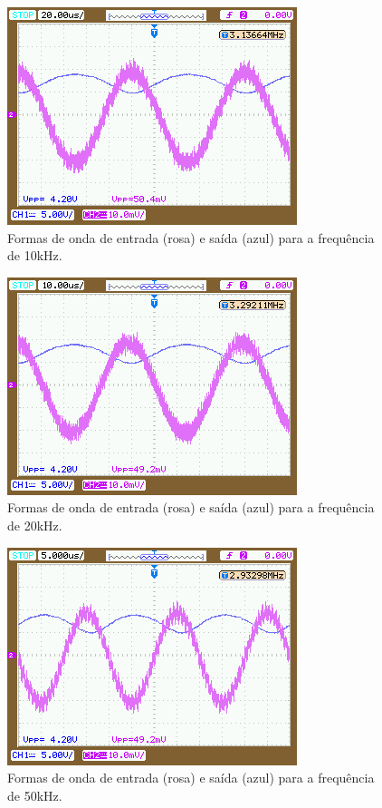 \documentclass{abntex2}
\begin{document}
  \begin{figure}[h]
    \centering
    \includegraphics[scale = 0.5]{freq_10k.png}
    \caption{Formas de onda de entrada (rosa) e saída (azul) para a frequência de 10kHz.}
    \label{fig:freq5}
  \end{figure}

  \begin{figure}[h]
    \centering
    \includegraphics[scale = 0.5]{freq_20k.png}
    \caption{Formas de onda de entrada (rosa) e saída (azul) para a frequência de 20kHz.}
    \label{fig:freq6}
  \end{figure}

  \begin{figure}[h]
    \centering
    \includegraphics[scale = 0.5]{freq_50k.png}
    \caption{Formas de onda de entrada (rosa) e saída (azul) para a frequência de 50kHz.}
    \label{fig:freq7}
  \end{figure}
\end{document}

